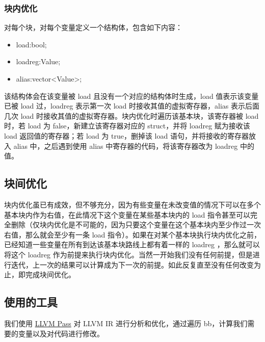 \documentclass{ctexart}
\begin{document}
    \subsubsection{块内优化}
    对每个块，对每个变量定义一个结构体，包含如下内容：
    \begin{itemize}
        \item load:bool;
        \item loadreg:Value;
        \item alias:vector<Value>;
    \end{itemize}
    该结构体会在该变量被 load 且没有一个对应的结构体时生成，load 值表示该变量已被 load 过，loadreg 表示第一次 load 时接收其值的虚拟寄存器，alias 表示后面几次 load 时接收其值的虚拟寄存器。块内优化时遍历该基本块，该寄存器被 load 时，若 load 为 false，新建立该寄存器对应的 struct，并将 loadreg 赋为接收该 load 返回值的寄存器；若 load 为 true，删掉该 load 语句，并将接收的寄存器放入 alias 中，之后遇到使用 alias 中寄存器的代码，将该寄存器改为 loadreg 中的值。
    \subsection{块间优化}
	块内优化虽已有成效，但不够充分，因为有些变量在未改变值的情况下可以在多个基本块内作为右值，在此情况下这个变量在某些基本块内的 load 指令甚至可以完全删除（仅块内优化是不可能的，因为只要这个变量在这个基本块内至少作过一次右值，那么就会至少有一条 load 指令）。如果在对某个基本块执行块内优化之前，已经知道一些变量在所有到达该基本块路线上都有着一样的 loadreg ，那么就可以将这个 loadreg 作为前提来执行块内优化。当然一开始我们没有任何前提，但是进行迭代，上一次的结果可以计算成为下一次的前提。如此反复直至没有任何改变为止，即完成块间优化。
	
    \subsection{使用的工具}
    我们使用 \href{https://llvm.org/docs/WritingAnLLVMPass.html}{LLVM Pass} 对 LLVM IR 进行分析和优化，通过遍历 bb，计算我们需要的变量以及对代码进行修改。
\end{document}
